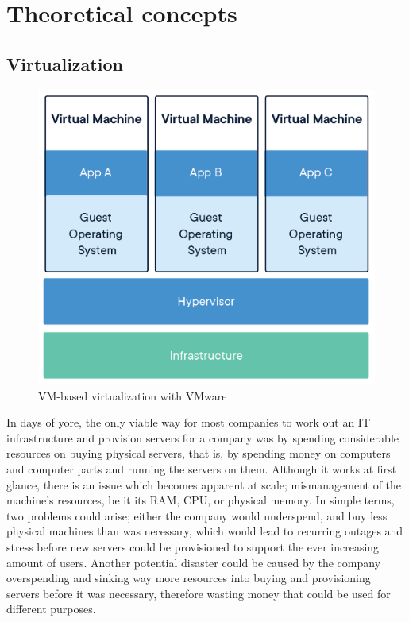 \documentclass[thesis=B,english]{FITthesis}[2019/12/23]
\begin{document}
\section{Theoretical concepts}

\subsection{Virtualization}

\begin{figure}[H]
\centering
\caption{VM-based virtualization with VMware \cite{what-container}}
\hspace*{-0.4cm}
\includegraphics[scale=0.75]{virtualization}
\end{figure}

In days of yore, the only viable way for most companies to work out an IT infrastructure and provision servers for a company was by spending considerable resources on buying physical servers, that is, by spending money on computers and computer parts and running the servers on them. Although it works at first glance, there is an issue which becomes apparent at scale; mismanagement of the machine’s resources, be it its RAM, CPU, or physical memory. In simple terms, two problems could arise; either the company would underspend, and buy less physical machines than was necessary, which would lead to recurring outages and stress before new servers could be provisioned to support the ever increasing amount of users. Another potential disaster could be caused by the company overspending and sinking way more resources into buying and provisioning servers before it was necessary, therefore wasting money that could be used for different purposes.
\end{document}
